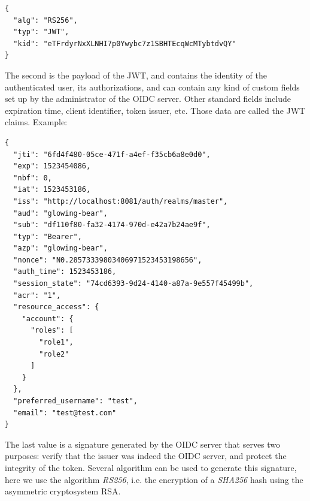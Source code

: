 \begin{verbatim}
{
  "alg": "RS256",
  "typ": "JWT",
  "kid": "eTFrdyrNxXLNHI7p0Ywybc7z1SBHTEcqWcMTybtdvQY"
}
\end{verbatim}

The second is the payload of the JWT, and contains the identity of the authenticated user, its authorizations, and can contain any kind of custom fields set up by the administrator of the OIDC server.
Other standard fields include expiration time, client identifier, token issuer, etc.
Those data are called the JWT claims.
Example:

\begin{verbatim}
{
  "jti": "6fd4f480-05ce-471f-a4ef-f35cb6a8e0d0",
  "exp": 1523454086,
  "nbf": 0,
  "iat": 1523453186,
  "iss": "http://localhost:8081/auth/realms/master",
  "aud": "glowing-bear",
  "sub": "df110f80-fa32-4174-970d-e42a7b24ae9f",
  "typ": "Bearer",
  "azp": "glowing-bear",
  "nonce": "N0.28573339803406971523453198656",
  "auth_time": 1523453186,
  "session_state": "74cd6393-9d24-4140-a87a-9e557f45499b",
  "acr": "1",
  "resource_access": {
    "account": {
      "roles": [
        "role1",
        "role2"
      ]
    }
  },
  "preferred_username": "test",
  "email": "test@test.com"
}
\end{verbatim}

The last value is a signature generated by the OIDC server that serves two purposes: verify that the issuer was indeed the OIDC server, and protect the integrity of the token.
Several algorithm can be used to generate this signature, here we use the algorithm \emph{RS256}, i.e. the encryption of a \emph{SHA256} hash using the asymmetric cryptosystem RSA.
